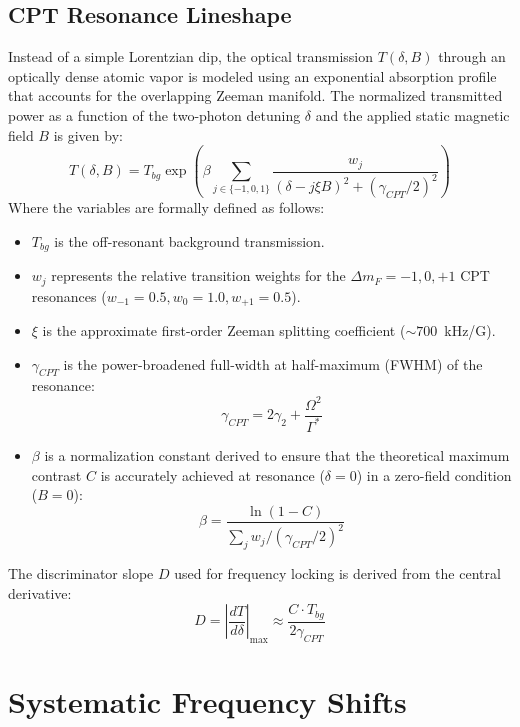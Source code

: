 \documentclass[11pt,a4paper]{article}
\begin{document}
\subsection{CPT Resonance Lineshape}
Instead of a simple Lorentzian dip, the optical transmission $T(\delta, B)$ through an optically dense atomic vapor is modeled using an exponential absorption profile that accounts for the overlapping Zeeman manifold. The normalized transmitted power as a function of the two-photon detuning $\delta$ and the applied static magnetic field $B$ is given by:
\begin{equation}
T(\delta, B) = T_{bg} \exp \left( \beta \sum_{j \in \{-1, 0, 1\}} \frac{w_j}{(\delta - j \xi B)^2 + (\gamma_{CPT}/2)^2} \right)
\end{equation}
Where the variables are formally defined as follows:
\begin{itemize}
    \item $T_{bg}$ is the off-resonant background transmission.
    \item $w_j$ represents the relative transition weights for the $\Delta m_F = -1, 0, +1$ CPT resonances ($w_{-1}=0.5, w_0=1.0, w_{+1}=0.5$).
    \item $\xi$ is the approximate first-order Zeeman splitting coefficient ($\sim 700$~kHz/G).
    \item $\gamma_{CPT}$ is the power-broadened full-width at half-maximum (FWHM) of the resonance:
    \begin{equation}
    \gamma_{CPT} = 2\gamma_2 + \frac{\Omega^2}{\Gamma^*}
    \end{equation}
    \item $\beta$ is a normalization constant derived to ensure that the theoretical maximum contrast $C$ is accurately achieved at resonance ($\delta = 0$) in a zero-field condition ($B = 0$):
    \begin{equation}
    \beta = \frac{\ln(1 - C)}{\sum_{j} w_j / (\gamma_{CPT}/2)^2}
    \end{equation}
\end{itemize}
The discriminator slope $D$ used for frequency locking is derived from the central derivative:
\begin{equation}
D = \left| \frac{dT}{d\delta} \right|_{\max} \approx \frac{C \cdot T_{bg}}{2 \gamma_{CPT}}
\end{equation}

\section{Systematic Frequency Shifts}
\end{document}
